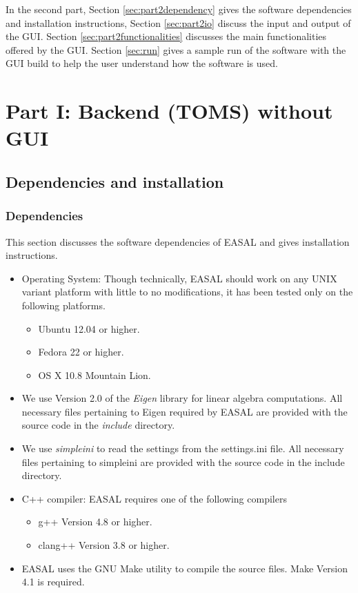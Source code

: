 \documentclass[10pt]{article}
\begin{document}
In the second part, Section \ref{sec:part2dependency} gives the software
dependencies and installation instructions, Section \ref{sec:part2io} discuss
the input and output of the GUI. Section \ref{sec:part2functionalities}
discusses the main functionalities offered by the GUI.  Section \ref{sec:run}
gives a sample run of the software with the GUI build to help the user
understand how the software is used.


\section{Part I: Backend (TOMS) without GUI}
\label{part1}

\subsection{Dependencies and installation}
\label{part1dependency}
\subsubsection{Dependencies}
This section discusses the software dependencies of EASAL and gives installation instructions.

\begin{itemize} 
  \item Operating System: Though technically, EASAL should work on any UNIX variant platform with little to no modifications, it has been tested only on  the following platforms. 
  \begin{itemize}
	\item Ubuntu 12.04 or higher.
	\item Fedora 22 or higher.
	\item OS X 10.8 Mountain Lion.
\end{itemize}
  \item We use Version 2.0 of the \emph{Eigen} library for linear algebra
		  computations. All necessary files pertaining to Eigen required by
		  EASAL are provided with the source code in the \emph{include}
		  directory.  
   
  \item We use \emph{simpleini} to read the settings from the
		  settings.ini file. All necessary files pertaining to simpleini are
		  provided with the source code in the include directory.
   
  \item C++ compiler: EASAL requires one of the following compilers
		  \begin{itemize}
		  	\item g++ Version 4.8 or higher.
		  	\item clang++ Version 3.8 or higher.
		  \end{itemize}
		  
  \item EASAL uses the GNU Make utility to compile the source files. Make
		  Version 4.1 is required.
\end{itemize}
\end{document}
